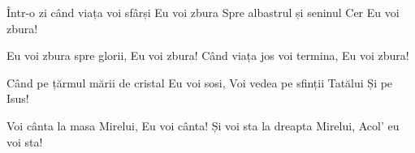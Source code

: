 \beginverse
Într-o zi când viața voi sfârși
Eu voi zbura
Spre albastrul și seninul Cer
Eu voi zbura!
\endverse

\beginchorus
Eu voi zbura spre glorii,
Eu voi zbura!
Când viața jos voi termina,
Eu voi zbura!
\endchorus

\beginverse
Când pe țărmul mării de cristal
Eu voi sosi,
Voi vedea pe sfinții Tatălui
Și pe Isus!
\endverse

\beginverse
Voi cânta la masa Mirelui,
Eu voi cânta!
Și voi sta la dreapta Mirelui,
Acol’ eu voi sta!
\endverse
\endsong